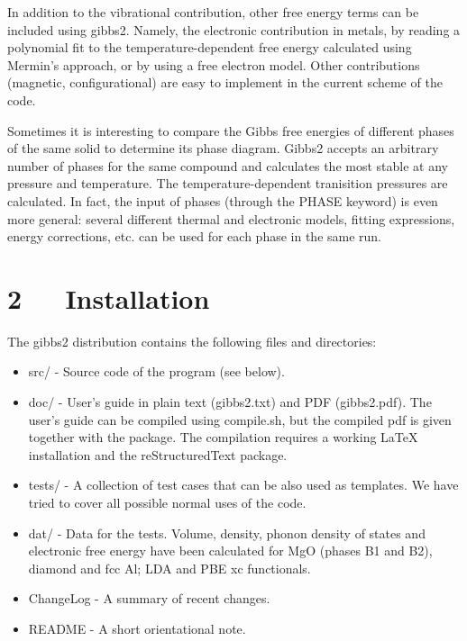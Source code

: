 \documentclass[a4paper]{article}
\begin{document}
In addition to the vibrational contribution, other free energy terms
can be included using gibbs2. Namely, the electronic contribution in
metals, by reading a polynomial fit to the temperature-dependent free
energy calculated using Mermin's approach, or by using a free electron
model. Other contributions (magnetic, configurational) are easy to
implement in the current scheme of the code.

Sometimes it is interesting to compare the Gibbs free energies of
different phases of the same solid to determine its phase
diagram. Gibbs2 accepts an arbitrary number of phases for the same
compound and calculates the most stable at any pressure and
temperature. The temperature-dependent tranisition pressures are
calculated. In fact, the input of phases (through the PHASE keyword)
is even more general: several different thermal and electronic models,
fitting expressions, energy corrections, etc. can be used for each
phase in the same run.


\section{2   Installation%
  \label{installation}%
}

The gibbs2 distribution contains the following files and directories:

\begin{itemize}
\item src/ - Source code of the program (see below).

\item doc/ - User's guide in plain text (gibbs2.txt) and PDF
(gibbs2.pdf). The user's guide can be compiled using compile.sh, but
the compiled pdf is given together with the package. The compilation
requires a working LaTeX installation and the reStructuredText
package.

\item tests/ - A collection of test cases that can be also used as
templates. We have tried to cover all possible normal uses of the
code.

\item dat/ - Data for the tests. Volume, density, phonon density of states
and electronic free energy have been calculated for MgO (phases B1
and B2), diamond and fcc Al; LDA and PBE xc functionals.

\item ChangeLog - A summary of recent changes.

\item README - A short orientational note.
\end{itemize}
\end{document}
